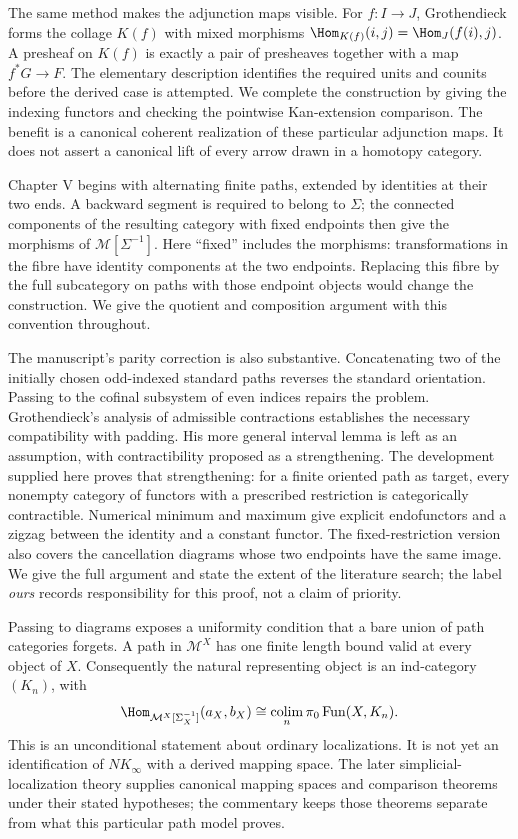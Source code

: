 The same method makes the adjunction maps visible. For $f:I\to J$,
Grothendieck forms the collage $K(f)$ with mixed morphisms
$\Hom_{K(f)}(i,j)=\Hom_J(f(i),j)$. A presheaf on $K(f)$ is exactly a
pair of presheaves together with a map $f^*G\to F$. The elementary
description identifies the required units and counits before the derived
case is attempted. We complete the construction by giving the indexing
functors and checking the pointwise Kan-extension comparison. The benefit
is a canonical coherent realization of these particular adjunction maps.
It does not assert a canonical lift of every arrow drawn in a homotopy
category.

Chapter V begins with alternating finite paths, extended by identities at
their two ends. A backward segment is required to belong to $\Sigma$;
the connected components of the resulting category with fixed endpoints
then give the morphisms of $\mathcal M[\Sigma^{-1}]$. Here ``fixed'' includes
the morphisms: transformations in the fibre have identity components at
the two endpoints. Replacing this fibre by the full subcategory on paths
with those endpoint objects would change the construction. We give the
quotient and composition argument with this convention throughout.

The manuscript's parity correction is also substantive. Concatenating two
of the initially chosen odd-indexed standard paths reverses the standard
orientation. Passing to the cofinal subsystem of even indices repairs the
problem. Grothendieck's analysis of admissible contractions establishes the
necessary compatibility with padding. His more general interval lemma is
left as an assumption, with contractibility proposed as a strengthening.
The development supplied here proves that strengthening: for a finite
oriented path as target, every nonempty category of functors with a prescribed
restriction is categorically contractible. Numerical minimum and maximum
give explicit endofunctors and a zigzag between the identity and a constant
functor. The fixed-restriction version also covers the cancellation diagrams
whose two endpoints have the same image. We give the full argument and state
the extent of the literature search; the label \emph{ours} records responsibility
for this proof, not a claim of priority.

Passing to diagrams exposes a uniformity condition that a bare union of
path categories forgets. A path in $\mathcal M^X$ has one finite length
bound valid at every object of $X$. Consequently the natural representing
object is an ind-category $(K_n)$, with
\[
 \Hom_{\mathcal M^X[\Sigma_X^{-1}]}(a_X,b_X)
   \cong\mathop{\rm colim}_n\pi_0\operatorname{Fun}(X,K_n).
\]
This is an unconditional statement about ordinary localizations. It is
not yet an identification of $NK_\infty$ with a derived mapping space.
The later simplicial-localization theory supplies canonical mapping spaces
and comparison theorems under their stated hypotheses; the commentary keeps
those theorems separate from what this particular path model proves.

